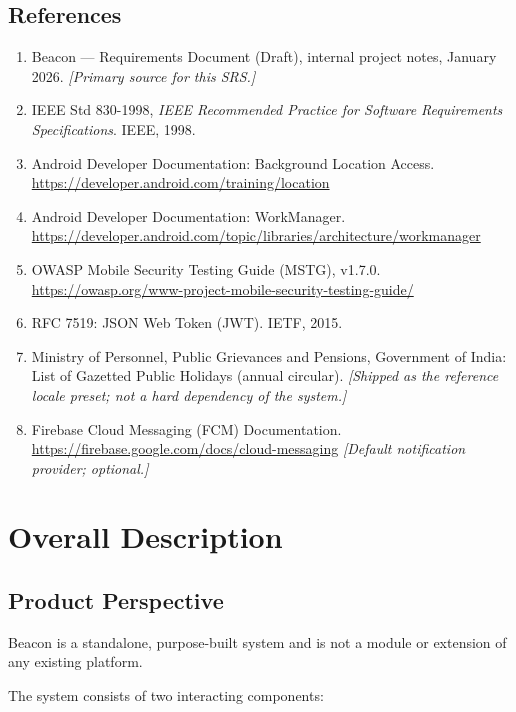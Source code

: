 \documentclass[12pt, a4paper]{article}
\begin{document}
\subsection{References}
\begin{enumerate}
    \item Beacon --- Requirements Document (Draft), internal project notes,
          January 2026. \textit{[Primary source for this SRS.]}
    \item IEEE Std 830-1998, \textit{IEEE Recommended Practice for Software
          Requirements Specifications}. IEEE, 1998.
    \item Android Developer Documentation: Background Location Access.
          \url{https://developer.android.com/training/location}
    \item Android Developer Documentation: WorkManager.
          \url{https://developer.android.com/topic/libraries/architecture/workmanager}
    \item OWASP Mobile Security Testing Guide (MSTG), v1.7.0.
          \url{https://owasp.org/www-project-mobile-security-testing-guide/}
    \item RFC 7519: JSON Web Token (JWT). IETF, 2015.
    \item Ministry of Personnel, Public Grievances and Pensions, Government
          of India: List of Gazetted Public Holidays (annual circular).
          \textit{[Shipped as the reference locale preset; not a hard
          dependency of the system.]}
    \item Firebase Cloud Messaging (FCM) Documentation.
          \url{https://firebase.google.com/docs/cloud-messaging}
          \textit{[Default notification provider; optional.]}
\end{enumerate}

\section{Overall Description}

\subsection{Product Perspective}
Beacon is a standalone, purpose-built system and is not a module or
extension of any existing platform.

The system consists of two interacting components:
\end{document}
